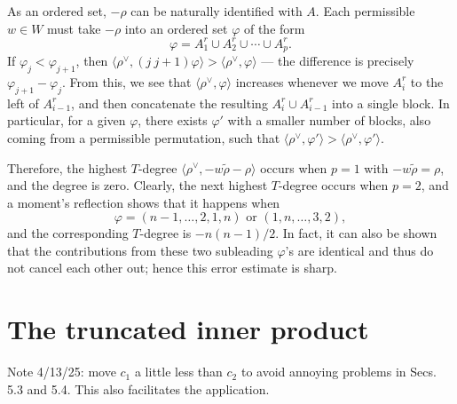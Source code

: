 \documentclass[11pt]{amsart}
\numberwithin{theorem}{section}
\numberwithin{equation}{section}
\theoremstyle{remark}
\theoremstyle{definition}
\begin{document}
As an ordered set, $-\rho$ can be naturally identified with $A$. Each permissible $w \in W$ must take $-\rho$ into an ordered set $\varphi$ of the form
\begin{equation*}
\varphi = A_1^r \cup A_2^r \cup \cdots \cup A_p^r.
\end{equation*}
If $\varphi_j < \varphi_{j+1}$, then $\langle \rho^\vee,(j\ j+1)\varphi\rangle > \langle \rho^\vee, \varphi\rangle$ --- the difference is precisely $\varphi_{j+1}-\varphi_j$. From this, we see that $\langle \rho^\vee, \varphi\rangle$ increases whenever we move $A_i^r$ to the left of $A_{i-1}^r$, and then concatenate the resulting $A_i^r \cup A_{i-1}^r$ into a single block. In particular, for a given $\varphi$, there exists $\varphi'$ with a smaller number of blocks, also coming from a permissible permutation, such that $\langle \rho^\vee, \varphi'\rangle > \langle \rho^\vee, \varphi'\rangle$.

Therefore, the highest $T$-degree $\langle \rho^\vee, -w\tilde\rho-\rho\rangle$ occurs when $p=1$ with $-w\tilde\rho=\rho$, and the degree is zero. Clearly, the next highest $T$-degree occurs when $p=2$, and a moment's reflection shows that it happens when
\begin{equation*}
\varphi = (n-1,\ldots,2,1,n) \mbox{ or } (1,n,\ldots,3,2),
\end{equation*}
and the corresponding $T$-degree is $-n(n-1)/2$. In fact, it can also be shown that the contributions from these two subleading $\varphi$'s are identical and thus do not cancel each other out; hence this error estimate is sharp.


\section{The truncated inner product}



{\color{blue} Note 4/13/25: move $c_1$ a little less than $c_2$ to avoid annoying problems in Secs. 5.3 and 5.4. This also facilitates the application.}
\end{document}

